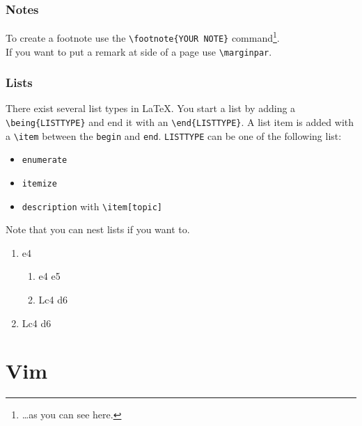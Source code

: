 \documentclass[10pt,a4paper]{scrartcl}
\begin{document}
\subsubsection{Notes}
To create a footnote use the \verb$\footnote{YOUR NOTE}$
command\footnote{\dots as you can see here.}. \\ If you want to put a remark
at side of a page use \verb$\marginpar$.  

\subsubsection{Lists}
There exist several list types in \LaTeX. You start a list by adding a
\verb$\being{LISTTYPE}$ and end it with an \verb$\end{LISTTYPE}$. A list item
is added with a \verb$\item$ between the \texttt{begin} and \texttt{end}.
\texttt{LISTTYPE} can be one of the following list:

\begin{itemize}
\item \texttt{enumerate}
\item \texttt{itemize}
\item \texttt{description} with \verb$\item[topic]$
\end{itemize}
\noindent Note that you can nest lists if you want to.

\begin{enumerate}
\item{e4} 	
	\begin{enumerate}
	\item{e4}   e5
	\item Lc4 d6
	\end{enumerate}
\item Lc4 d6
\end{enumerate}


\section{Vim}
\end{document}
